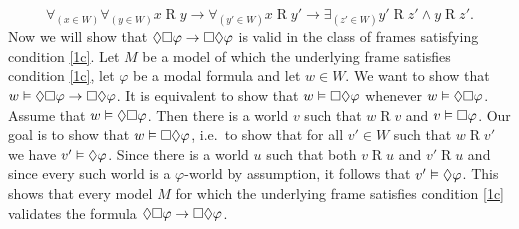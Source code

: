 \documentclass{article}
\begin{document}
\begin{ex}
\begin{enumerate}
\begin{equation}\label{1c}
\forall_{(x\in W)}\forall_{(y\in W)} x\mathbin{R}y\to \forall_{(y'\in W)} x\mathbin{R}y'\to\exists_{(z'\in W)}y'\mathbin{R} z'\land y\mathbin{R} z'.
\end{equation}
Now we will show that $\lozenge\square\varphi\to\square\lozenge\varphi$ is valid in the class
of frames satisfying condition \ref{1c}. Let $M$ be a model of which the underlying
frame satisfies condition \ref{1c}, let $\varphi$ be a modal formula and let 
$w\in W$. We want to show that $w\vDash\lozenge\square\varphi\to\square\lozenge\varphi$. It
is equivalent to show that $w\vDash\square\lozenge\varphi$ whenever 
$w\vDash\lozenge\square\varphi$. Assume that $w\vDash\lozenge\square\varphi$. Then there is
a world $v$ such that $w\mathbin{R} v$ and $v\vDash\square\varphi$. Our goal is
to show that $w\vDash\square\lozenge\varphi$, i.e.~to show that for all $v'\in W$
such that $w\mathbin{R}v'$ we have $v'\vDash\lozenge\varphi$. Since there is a world
$u$ such that both $v\mathbin{R} u$ and $v'\mathbin{R} u$ and since every such
world is a $\varphi$-world by assumption, it follows that $v'\vDash\lozenge\varphi$.
This shows that every model $M$ for which the underlying frame satisfies
condition \ref{1c} validates the formula $\lozenge\square\varphi\to\square\lozenge\varphi$.
\end{enumerate}
\end{ex}
\end{document}
